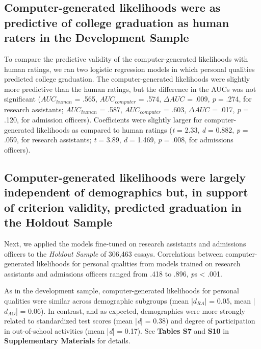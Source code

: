 \documentclass[11pt]{report}
\begin{document}
\begin{mainf}
\subsection{Computer-generated likelihoods were as predictive of college graduation as human raters in the Development Sample}
To compare the predictive validity of the computer-generated likelihoods with human ratings, we ran two logistic regression models in which personal qualities predicted college graduation. The computer-generated likelihoods were slightly more predictive than the human ratings, but the difference in the AUCs was not significant ($AUC_{human}$ = .565, $AUC_{computer}$ = .574, $\Delta AUC$ = .009, \textit{p} = .274, for research assistants; $AUC_{human}$ = .587, $AUC_{computer}$ = .603, $\Delta AUC$ = .017, \textit{p} = .120, for admission officers). Coefficients were slightly larger for computer-generated likelihoods as compared to human ratings (\textit{t} = 2.33, \textit{d} = 0.882, \textit{p} = .059, for research assistants; \textit{t} = 3.89, \textit{d} = 1.469, \textit{p} = .008, for admissions officers).

\subsection{Computer-generated likelihoods were largely independent of demographics but, in support of criterion validity, predicted graduation in the Holdout Sample}
Next, we applied the models fine-tuned on research assistants and admissions officers to the \textit{Holdout Sample} of 306,463 essays.  Correlations between computer-generated likelihoods for personal qualities from models trained on research assistants and admissions officers ranged from .418 to .896, \textit{p}s < .001.

As in the development sample, computer-generated likelihoods for personal qualities were similar across demographic subgroups (mean |$d_{RA}$| = 0.05, mean |$d_{AO}$| = 0.06). In contrast, and as expected, demographics were more strongly related to standardized test scores (mean |\textit{d}| = 0.38) and degree of participation in out-of-school activities (mean |\textit{d}| = 0.17). See \textbf{Tables S7} and \textbf{S10} in \textbf{Supplementary Materials} for details.


\end{mainf}
\end{document}
